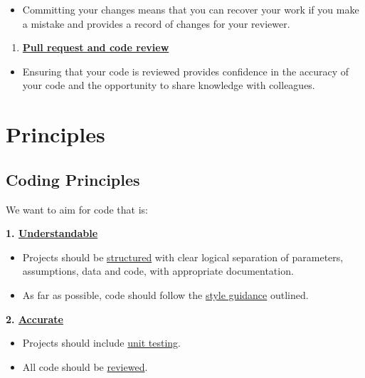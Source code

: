 \documentclass[]{book}
\providecommand{\tightlist}{%
  \setlength{\itemsep}{0pt}\setlength{\parskip}{0pt}}
\begin{document}
\begin{itemize}
\tightlist
\item
  Committing your changes means that you can recover your work if you make a mistake and provides a record of changes for your reviewer.\\
\end{itemize}

\begin{enumerate}
\def\labelenumi{\arabic{enumi}.}
\setcounter{enumi}{6}
\tightlist
\item
  \textbf{\protect\hyperlink{review}{Pull request and code review}}\\
\end{enumerate}

\begin{itemize}
\tightlist
\item
  Ensuring that your code is reviewed provides confidence in the accuracy of your code and the opportunity to share knowledge with colleagues.
\end{itemize}

\hypertarget{part-principles}{%
\part{Principles}\label{part-principles}}

\hypertarget{principles}{%
\chapter*{Coding Principles}\label{principles}}

We want to aim for code that is:

\textbf{1. \protect\hyperlink{understand}{Understandable}}

\begin{itemize}
\tightlist
\item
  Projects should be \protect\hyperlink{structure2}{structured} with clear logical separation of parameters, assumptions, data and code, with appropriate documentation.\\
\item
  As far as possible, code should follow the \protect\hyperlink{style}{style guidance} outlined.
\end{itemize}

\textbf{2. \protect\hyperlink{accurate}{Accurate}}

\begin{itemize}
\tightlist
\item
  Projects should include \protect\hyperlink{unittest}{unit testing}.
\item
  All code should be \protect\hyperlink{review}{reviewed}.
\end{itemize}
\end{document}
